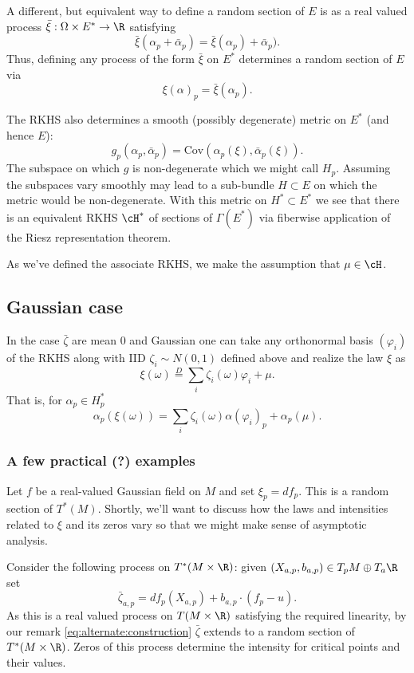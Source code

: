 \documentclass{article}
\begin{document}
A different, but equivalent way to define a random section of $E$ is as a real valued process $\bar{\xi}:\Omega \times E^* \rightarrow \R$ satisfying
\begin{equation}
  \label{eq:alternate:construction}
\bar{\xi}(\alpha_p + \bar{\alpha}_p) = \bar{\xi}(\alpha_p) + \bar{\alpha}_p).
\end{equation}
Thus, defining any process of the form $\bar{\xi}$ on $E^*$ determines a random section of $E$ via
$$
\xi(\alpha)_p = \bar{\xi}(\alpha_p).
$$

The RKHS also determines a smooth (possibly degenerate) metric on $E^*$ (and hence $E$):
$$
g_p(\alpha_p, \bar{\alpha}_p) = \text{Cov}(\alpha_p(\xi), \bar{\alpha}_p(\xi)).
$$
The subspace on which $g$ is non-degenerate which we might call $H_p$. Assuming the subspaces vary
smoothly may lead to a sub-bundle $H \subset E$ on which the metric would be non-degenerate.
With this metric on $H^* \subset E^*$ we see that there is an equivalent RKHS $\cH^*$ of sections of $\Gamma(E^*)$ via fiberwise
application of the Riesz representation theorem. 

As we've defined the associate RKHS, we make the assumption that $\mu \in \cH$.

\subsection{Gaussian case}

In the case $\bar{\zeta}$ are mean 0 and Gaussian one can take any orthonormal basis
$(\varphi_i)$ of the RKHS along with IID $\zeta_i \sim N(0,1)$ defined above and realize the law $\xi$ as
\begin{equation}
  \label{eq:KL}
\xi(\omega) \overset{D}{=} \sum_i \zeta_i(\omega) \varphi_i + \mu.
\end{equation}
That is, for $\alpha_p \in H_p^*$
$$
\alpha_p(\xi(\omega)) = \sum_i \zeta_i(\omega) \alpha(\varphi_i)_p + \alpha_p(\mu).
$$

\subsubsection{A few practical (?) examples}

Let $f$ be a real-valued Gaussian field on $M$ and set $\xi_p = df_p$. This is a random section of $T^*(M)$. Shortly,
we'll want to discuss how the laws and intensities related to $\xi$ and its zeros vary so that we might make
sense of asymptotic analysis. 

Consider the following process on $T^*(M \times \R)$: given $(X_{a,p}, b_{a,p}) \in T_p M \oplus T_a \R$ set
$$
\bar{\zeta}_{a,p} = df_p(X_{a,p}) + b_{a,p} \cdot (f_p - u).
$$
As this is a real valued process on $T(M \times \R)$ satisfying the required linearity, by our remark
\eqref{eq:alternate:construction} $\bar{\zeta}$ extends to a random section of $T^*(M \times \R)$. Zeros of
this process determine the intensity for critical points and their values.
\end{document}
